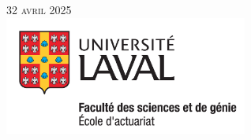 \begin{titlepage}
\textsc{\large 32 avril 2025}\\[1cm] %

\includegraphics[width=8cm,keepaspectratio]{ul-actuariat.png}\\[1.5cm]
 
\vfill %

\end{titlepage}
%